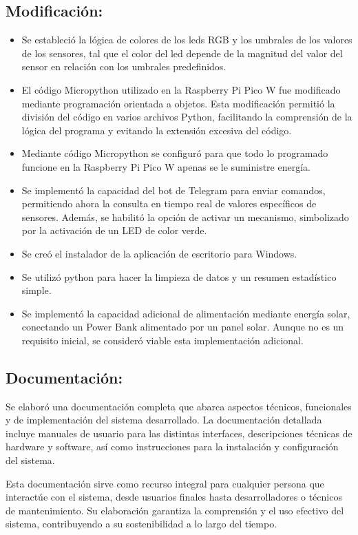 \subsection{Modificación:}
\begin{itemize}
	\item Se estableció la lógica de colores de los leds RGB y los umbrales de los valores de los sensores, tal que el color del led depende de la magnitud del valor del sensor en relación con los umbrales predefinidos.
	\item El código Micropython utilizado en la Raspberry Pi Pico W fue modificado mediante programación orientada a objetos. Esta modificación permitió la división del código en varios archivos Python, facilitando la comprensión de la lógica del programa y evitando la extensión excesiva del código.
	\item Mediante código Micropython se configuró para que todo lo programado funcione en la Raspberry Pi Pico W apenas se le suministre energía.
	\item Se implementó la capacidad del bot de Telegram para enviar comandos, permitiendo ahora la consulta en tiempo real de valores específicos de sensores. Además, se habilitó la opción de activar un mecanismo, simbolizado por la activación de un LED de color verde.
	\item Se creó el instalador de la aplicación de escritorio para Windows.
	\item Se utilizó python para hacer la limpieza de datos y un resumen estadístico simple.
	\item Se implementó la capacidad adicional de alimentación mediante energía solar, conectando un Power Bank alimentado por un panel solar. Aunque no es un requisito inicial, se consideró viable esta implementación adicional.
\end{itemize}

\subsection{Documentación:}

Se elaboró una documentación completa que abarca aspectos técnicos, funcionales y de implementación del sistema desarrollado. La documentación detallada incluye manuales de usuario para las distintas interfaces, descripciones técnicas de hardware y software, así como instrucciones para la instalación y configuración del sistema.

Esta documentación sirve como recurso integral para cualquier persona que interactúe con el sistema, desde usuarios finales hasta desarrolladores o técnicos de mantenimiento. Su elaboración garantiza la comprensión y el uso efectivo del sistema, contribuyendo a su sostenibilidad a lo largo del tiempo.

